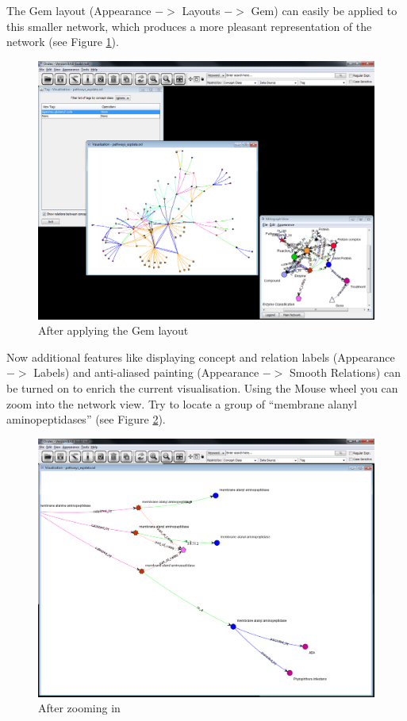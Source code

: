 The Gem layout (Appearance $->$ Layouts $->$ Gem) can easily be applied to this smaller network, which produces a more pleasant representation of the network
(see Figure \ref{fig:tag_gem}).

\begin{figure}[H]
\centering
\includegraphics[scale=0.35]{images/Oct12/app1fig5.png} 
\caption{After applying the Gem layout}
\label{fig:tag_gem}
\end{figure}

Now additional features like displaying concept and relation labels (Appearance $->$ Labels) 
and anti-aliased painting (Appearance $->$ Smooth Relations) can be turned on to enrich the current visualisation. 
Using the Mouse wheel you can zoom into the network view. Try to locate a group of ``membrane alanyl aminopeptidases'' (see Figure \ref{fig:membrane}).

\begin{figure}[H]
\centering
\includegraphics[scale=0.35]{images/Oct12/app1fig6.png} 
\caption{After zooming in}
\label{fig:membrane}
\end{figure}

